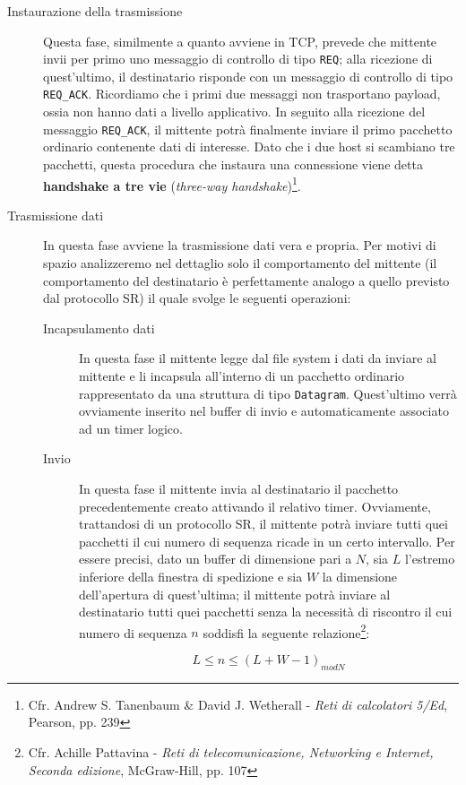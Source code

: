 \documentclass[10pt,a4paper, titlepage]{report}
\begin{document}
\begin{description}
\item[Instaurazione della trasmissione] Questa fase, similmente a quanto avviene in TCP, prevede che mittente invii per primo uno messaggio di controllo di tipo \texttt{REQ}; alla ricezione di quest'ultimo, il destinatario risponde con un messaggio di controllo di tipo \texttt{REQ\_ACK}. Ricordiamo che i primi due messaggi non trasportano payload, ossia non hanno dati a livello applicativo. In seguito alla ricezione del messaggio \texttt{REQ\_ACK}, il mittente potrà finalmente inviare il primo pacchetto ordinario contenente dati di interesse. Dato che i due host si scambiano tre pacchetti, questa procedura che instaura una connessione viene detta \textbf{handshake a tre vie} (\textit{three-way handshake})\footnote{Cfr. Andrew S. Tanenbaum \& David J. Wetherall - \textit{Reti di calcolatori 5/Ed}, Pearson, pp. 239}.
 
\item[Trasmissione dati] In questa fase avviene la trasmissione dati vera e propria. Per motivi di spazio analizzeremo nel dettaglio solo il comportamento del mittente (il comportamento del destinatario è perfettamente analogo a quello previsto dal protocollo SR) il quale svolge le seguenti operazioni: 

\begin{description}
\item[Incapsulamento dati] In questa fase il mittente legge dal file system i dati da inviare al mittente e li incapsula all'interno di un pacchetto ordinario rappresentato da una struttura di tipo \texttt{Datagram}. Quest'ultimo verrà ovviamente inserito nel buffer di invio e automaticamente associato ad un timer logico. 
\item[Invio] In questa fase il mittente invia al destinatario il pacchetto precedentemente creato attivando il relativo timer. Ovviamente, trattandosi di un protocollo SR, il mittente potrà inviare tutti quei pacchetti il cui numero di sequenza ricade in un certo intervallo. Per essere precisi, dato un buffer di dimensione pari a $N$, sia $L$ l'estremo inferiore della finestra di spedizione e sia $W$ la dimensione dell'apertura di quest'ultima; il mittente potrà inviare al destinatario tutti quei pacchetti senza la necessità di riscontro il cui numero di sequenza $n$ soddisfi la seguente relazione\footnote{Cfr. Achille Pattavina - \textit{Reti di telecomunicazione, Networking e Internet, Seconda edizione}, McGraw-Hill, pp. 107}:

\begin{equation}
L \leq n \leq (L + W -1)_{mod N}
\end{equation}


\end{description}
\end{description}
\end{document}
